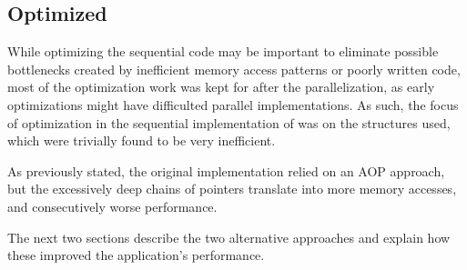 \subsection{Optimized}


While optimizing the sequential code may be important to eliminate possible bottlenecks created by inefficient memory access patterns or poorly written code, most of the optimization work was kept for after the parallelization, as early optimizations might have difficulted parallel implementations.
As such, the focus of optimization in the sequential implementation of \polu was on the structures used, which were trivially found to be very inefficient.

As previously stated, the original implementation relied on an AOP approach, but the excessively deep chains of pointers translate into more memory accesses, and consecutively worse performance.

The next two sections describe the two alternative approaches and explain how these improved the application's performance.




